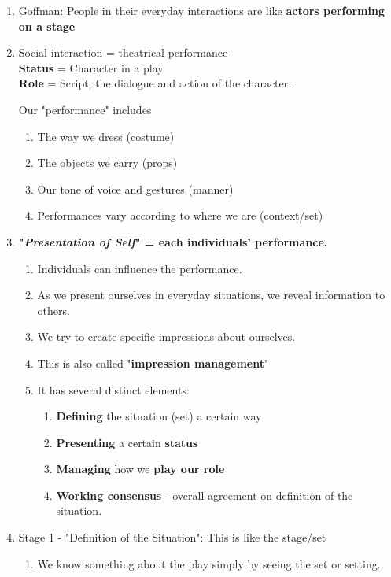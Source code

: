 \documentclass[12pt,a4paper]{article}
\begin{document}
\begin{enumerate}
\begin{enumerate}
		\item Goffman: People in their everyday interactions are like \textbf{actors performing on a stage}
		\item Social interaction = theatrical performance\\
		\textbf{Status} = Character in a play\\
		\textbf{Role} = Script; the dialogue and action of the character. 
		\begin{eg}{Our "performance" includes}
			\begin{enumerate}
				\item The way we dress (costume)
				\item The objects we carry (props)
				\item Our tone of voice and gestures (manner)
				\item Performances vary according to where we are (context/set)
			\end{enumerate}
		\end{eg}
		\item \textbf{"\textit{Presentation of Self}" = each individuals' performance.}
		\begin{enumerate}
			\item Individuals can influence the performance.
			\item As we present ourselves in everyday situations, we reveal information to others.
			\item We try to create specific impressions about ourselves. 
			\item This is also called "\textbf{impression management}"
			\item It has several distinct elements: 
			\begin{enumerate}
				\item \textbf{Defining} the situation (set) a certain way
				\item \textbf{Presenting} a certain \textbf{status}
				\item \textbf{Managing} how we \textbf{play our role}
				\item \textbf{Working consensus} - overall agreement on definition of the situation. 
			\end{enumerate}
		\end{enumerate}
		\item Stage 1 - "Definition of the Situation":  This is like the stage/set
		\begin{enumerate}
			\item We know something about the play simply by seeing the set or setting. 

\end{enumerate}
\end{enumerate}
\end{enumerate}
\end{document}
